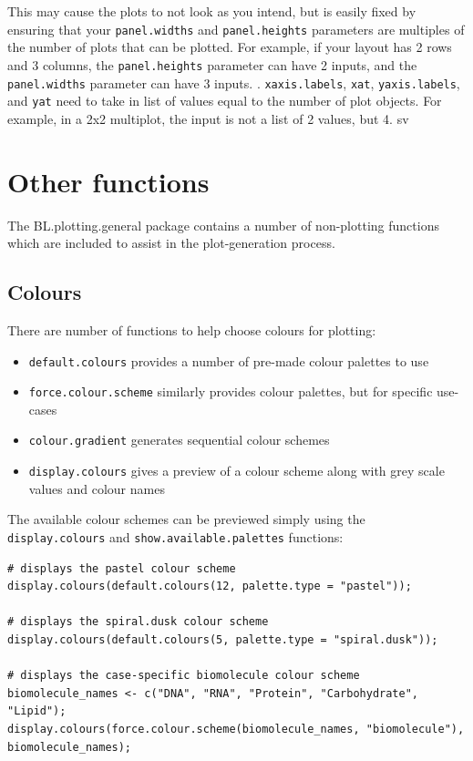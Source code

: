 \documentclass[letterpaper]{report}\usepackage[]{graphicx}\usepackage[]{color}
\begin{document}
This may cause the plots to not look as you intend, but is easily fixed by ensuring that your \texttt{panel.widths} and \texttt{panel.heights} parameters are multiples of the number of plots that can be plotted. For example, if your layout has 2 rows and 3 columns, the \texttt{panel.heights} parameter can have 2 inputs, and the \texttt{panel.widths} parameter can have 3 inputs.
\newline
{}. \texttt{xaxis.labels}, \texttt{xat}, \texttt{yaxis.labels}, and \texttt{yat} need to take in list of values equal to the number of plot objects. For example, in a 2x2 multiplot, the input is not a list of 2 values, but 4.
sv 
\section{Other functions}
The BL.plotting.general package contains a number of non-plotting functions which are included to assist in the plot-generation process. 

\subsection{Colours}
There are number of functions to help choose colours for plotting:
\begin{itemize}
\item \texttt{default.colours} provides a number of pre-made colour palettes to use
\item \texttt{force.colour.scheme} similarly provides colour palettes, but for specific use-cases
\item \texttt{colour.gradient} generates sequential colour schemes
\item \texttt{display.colours} gives a preview of a colour scheme along with grey scale values and colour names
\end{itemize}

The available colour schemes can be previewed simply using the \verb|display.colours| and \verb|show.available.palettes| functions:

\begin{verbatim}
# displays the pastel colour scheme
display.colours(default.colours(12, palette.type = "pastel"));

# displays the spiral.dusk colour scheme
display.colours(default.colours(5, palette.type = "spiral.dusk"));

# displays the case-specific biomolecule colour scheme
biomolecule_names <- c("DNA", "RNA", "Protein", "Carbohydrate", "Lipid");
display.colours(force.colour.scheme(biomolecule_names, "biomolecule"), biomolecule_names);
\end{verbatim}
\end{document}
